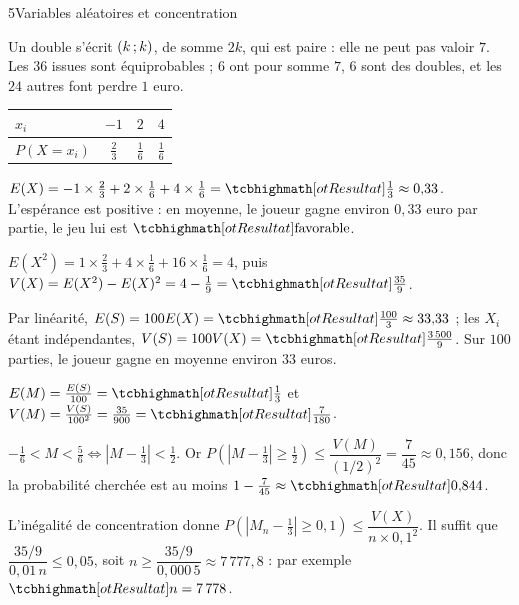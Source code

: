 

\begin{corrigeBac}{5}{Variables aléatoires et concentration}
\begin{questions}
  \item Un double s'écrit $(k\,{;}\, k)$, de somme $2k$, qui est paire : elle ne peut pas valoir $7$. Les $36$ issues sont équiprobables ;
    $6$ ont pour somme $7$, $6$ sont des doubles, et les $24$ autres font perdre $1$ euro.
\begin{center}
{\renewcommand{\arraystretch}{1.35}%
\begin{tabular}{@{}lccc@{}}
\toprule
$x_i$ & $-1$ & $2$ & $4$ \\
\midrule
$P(X=x_i)$ & $\frac23$ & $\frac16$ & $\frac16$ \\
\bottomrule
\end{tabular}}
\end{center}
    \pts{1 pt}
  \item $E(X)=-1\times\frac23+2\times\frac16+4\times\frac16=\res{\tfrac13}\approx0{,}33$. L'espérance est positive : en moyenne, le
    joueur gagne environ $0{,}33$ euro par partie, le jeu lui est $\res{\text{favorable}}$. 
  \item $E(X^{2})=1\times\frac23+4\times\frac16+16\times\frac16=4$, puis $V(X)=E(X^{2})-E(X)^{2}=4-\frac19=\res{\tfrac{35}{9}}$. 
\end{questions}
\begin{questions}[resume]
  \item Par linéarité, $E(S)=100E(X)=\res{\tfrac{100}{3}}\approx33{,}33$ ; les $X_i$ étant indépendantes,
    $V(S)=100V(X)=\res{\tfrac{3\,500}{9}}$. Sur $100$ parties, le joueur gagne en moyenne environ $33$ euros. 
  \item $E(M)=\frac{E(S)}{100}=\res{\tfrac13}$ et $V(M)=\frac{V(S)}{100^{2}}=\frac{35}{900}=\res{\tfrac{7}{180}}$. 
  \item $-\frac16<M<\frac56\iff\left|M-\frac13\right|<\frac12$. Or
    $P\left(\left|M-\frac13\right|\geq\frac12\right)\leq\dfrac{V(M)}{(1/2)^{2}}=\dfrac{7}{45}\approx0{,}156$, donc la probabilité cherchée
    est au moins $1-\frac7{45}\approx\res{0{,}844}$. 
  \item L'inégalité de concentration donne $P\left(\left|M_n-\frac13\right|\geq0{,}1\right)\leq\dfrac{V(X)}{n\times0{,}1^{2}}$. Il suffit
    que $\dfrac{35/9}{0{,}01\,n}\leq0{,}05$, soit $n\geq\dfrac{35/9}{0{,}000\,5}\approx7\,777{,}8$ : par exemple $\res{n=7\,778}$. 
\end{questions}
\end{corrigeBac}

